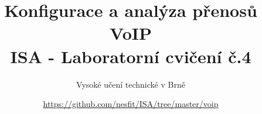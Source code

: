 \documentclass[a4paper,11pt]{article}
\title{Konfigurace a analýza přenosů VoIP\\
{\bf\large ISA - Laboratorní cvičení č.4}}
\author{Vysoké učení technické v Brně}
\date{\url{https://github.com/nesfit/ISA/tree/master/voip}}
\begin{document}
{\let\newpage\relax\maketitle}


\end{document}
